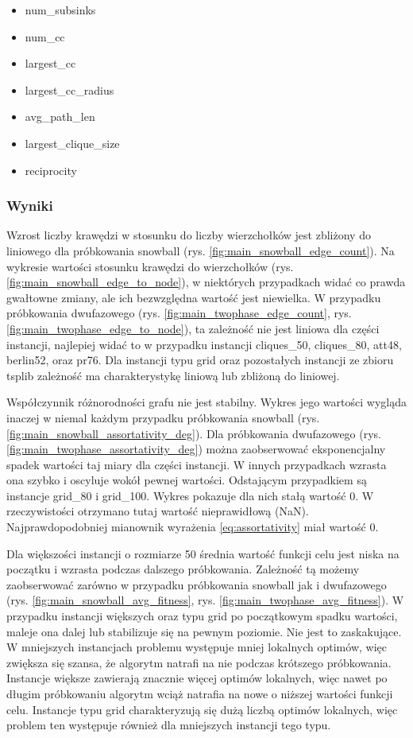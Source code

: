 \begin{itemize}
    \item num\_subsinks
    \item num\_cc
    \item largest\_cc
    \item largest\_cc\_radius
    \item avg\_path\_len
    \item largest\_clique\_size
    \item reciprocity
\end{itemize}

\subsubsection{Wyniki}



Wzrost liczby krawędzi w stosunku do liczby wierzchołków jest zbliżony do liniowego dla próbkowania snowball (rys. \ref{fig:main_snowball_edge_count}).
Na wykresie wartości stosunku krawędzi do wierzchołków (rys. \ref{fig:main_snowball_edge_to_node}), w niektórych przypadkach widać co prawda gwałtowne zmiany, ale
ich bezwzględna wartość jest niewielka.
W przypadku próbkowania dwufazowego (rys. \ref{fig:main_twophase_edge_count}, rys.\ref{fig:main_twophase_edge_to_node}), ta zależność nie jest liniowa dla części instancji,
najlepiej widać to w przypadku instancji cliques\_50, cliques\_80, att48, berlin52, oraz pr76.
Dla instancji typu grid oraz pozostałych instancji ze zbioru tsplib zależność ma charakterystykę liniową lub zbliżoną do liniowej.

Współczynnik różnorodności grafu nie jest stabilny. Wykres jego wartości wygląda inaczej w niemal każdym przypadku
próbkowania snowball (rys. \ref{fig:main_snowball_assortativity_deg}).
Dla próbkowania dwufazowego (rys. \ref{fig:main_twophase_assortativity_deg}) można zaobserwować eksponencjalny spadek wartości taj miary dla części instancji.
W innych przypadkach wzrasta ona szybko i oscyluje wokół pewnej wartości.
Odstającym przypadkiem są instancje grid\_80 i grid\_100. Wykres pokazuje dla nich stałą wartość 0.
W rzeczywistości otrzymano tutaj wartość nieprawidłową (NaN). Najprawdopodobniej mianownik wyrażenia \ref{eq:assortativity}
miał wartość 0.

Dla większości instancji o rozmiarze 50 średnia wartość funkcji celu jest niska na początku i wzrasta podczas dalszego próbkowania.
Zależność tą możemy zaobserwować zarówno w przypadku próbkowania snowball jak i dwufazowego (rys. \ref{fig:main_snowball_avg_fitness}, rys. \ref{fig:main_twophase_avg_fitness}).
W przypadku instancji większych oraz typu grid po początkowym spadku wartości, maleje ona dalej lub stabilizuje się na pewnym poziomie.
Nie jest to zaskakujące. W mniejszych instancjach problemu występuje mniej lokalnych optimów, więc zwiększa się szansa, że algorytm
natrafi na nie podczas krótszego próbkowania. Instancje większe zawierają znacznie więcej optimów lokalnych, więc nawet po długim próbkowaniu
algorytm wciąż natrafia na nowe o niższej wartości funkcji celu. Instancje typu grid charakteryzują się dużą liczbą optimów lokalnych,
więc problem ten występuje również dla mniejszych instancji tego typu.

